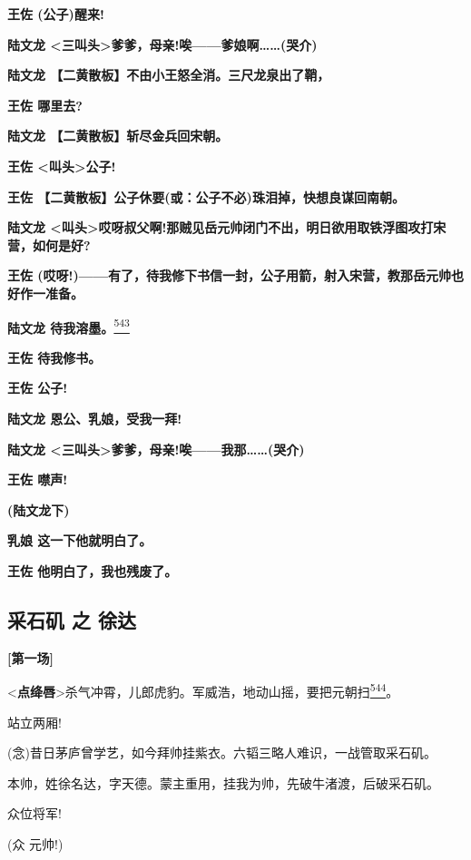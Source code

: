 \textbf{王佐 (公子)醒来!}

\textbf{陆文龙
\textless{}三叫头\textgreater{}爹爹，母亲!唉------爹娘啊\ldots{}\ldots{}(哭介)}

\textbf{陆文龙 【二黄散板】不由小王怒全消。三尺龙泉出了鞘，}

\textbf{王佐 哪里去?}

\textbf{陆文龙 【二黄散板】斩尽金兵回宋朝。}

\textbf{王佐 \textless{}叫头\textgreater{}公子!}

\textbf{王佐 【二黄散板】公子休要(或：公子不必)珠泪掉，快想良谋回南朝。}

\textbf{陆文龙
\textless{}叫头\textgreater{}哎呀叔父啊!那贼见岳元帅闭门不出，明日欲用取铁浮图攻打宋营，如何是好?}

\textbf{王佐
(哎呀!)------有了，待我修下书信一封，公子用箭，射入宋营，教那岳元帅也好作一准备。}

\textbf{陆文龙
待我溶墨。}\protect\hyperlink{fn543}{\textsuperscript{543}}

\textbf{王佐 待我修书。}

\textbf{王佐 公子!}

\textbf{陆文龙 恩公、乳娘，受我一拜!}

\textbf{陆文龙
\textless{}三叫头\textgreater{}爹爹，母亲!唉------我那\ldots{}\ldots{}(哭介)}

\textbf{王佐 噤声!}

\textbf{(陆文龙下)}

\textbf{乳娘 这一下他就明白了。}

\textbf{王佐 他明白了，我也残废了。}

\hypertarget{ux91c7ux77f3ux77f6-ux4e4b-ux5f90ux8fbe}{%
\subsection{采石矶 之
徐达}\label{ux91c7ux77f3ux77f6-ux4e4b-ux5f90ux8fbe}}

\textbf{{[}第一场{]}}

\textless{}\textbf{点绛唇}\textgreater{}杀气冲霄，儿郎虎豹。军威浩，地动山摇，要把元朝扫\protect\hyperlink{fn544}{\textsuperscript{544}}。

站立两厢!

(念)昔日茅庐曾学艺，如今拜帅挂紫衣。六韬三略人难识，一战管取采石矶。

本帅，姓徐名达，字天德。蒙主重用，挂我为帅，先破牛渚渡，后破采石矶。

众位将军!

(众 元帅!)

